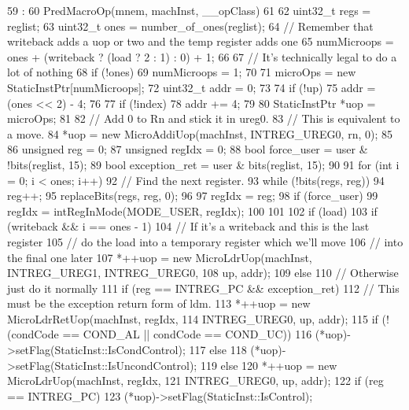 \begin{DoxyCode}
59                                                     :
60     PredMacroOp(mnem, machInst, __opClass)
61 {
62     uint32_t regs = reglist;
63     uint32_t ones = number_of_ones(reglist);
64     // Remember that writeback adds a uop or two and the temp register adds one
65     numMicroops = ones + (writeback ? (load ? 2 : 1) : 0) + 1;
66 
67     // It's technically legal to do a lot of nothing
68     if (!ones)
69         numMicroops = 1;
70 
71     microOps = new StaticInstPtr[numMicroops];
72     uint32_t addr = 0;
73 
74     if (!up)
75         addr = (ones << 2) - 4;
76 
77     if (!index)
78         addr += 4;
79 
80     StaticInstPtr *uop = microOps;
81 
82     // Add 0 to Rn and stick it in ureg0.
83     // This is equivalent to a move.
84     *uop = new MicroAddiUop(machInst, INTREG_UREG0, rn, 0);
85 
86     unsigned reg = 0;
87     unsigned regIdx = 0;
88     bool force_user = user & !bits(reglist, 15);
89     bool exception_ret = user & bits(reglist, 15);
90 
91     for (int i = 0; i < ones; i++) {
92         // Find the next register.
93         while (!bits(regs, reg))
94             reg++;
95         replaceBits(regs, reg, 0);
96 
97         regIdx = reg;
98         if (force_user) {
99             regIdx = intRegInMode(MODE_USER, regIdx);
100         }
101 
102         if (load) {
103             if (writeback && i == ones - 1) {
104                 // If it's a writeback and this is the last register
105                 // do the load into a temporary register which we'll move
106                 // into the final one later
107                 *++uop = new MicroLdrUop(machInst, INTREG_UREG1, INTREG_UREG0,
108                         up, addr);
109             } else {
110                 // Otherwise just do it normally
111                 if (reg == INTREG_PC && exception_ret) {
112                     // This must be the exception return form of ldm.
113                     *++uop = new MicroLdrRetUop(machInst, regIdx,
114                                                INTREG_UREG0, up, addr);
115                     if (!(condCode == COND_AL || condCode == COND_UC))
116                         (*uop)->setFlag(StaticInst::IsCondControl);
117                     else
118                         (*uop)->setFlag(StaticInst::IsUncondControl);
119                 } else {
120                     *++uop = new MicroLdrUop(machInst, regIdx,
121                                             INTREG_UREG0, up, addr);
122                     if (reg == INTREG_PC) {
123                         (*uop)->setFlag(StaticInst::IsControl);
}}}}}}
\end{DoxyCode}
